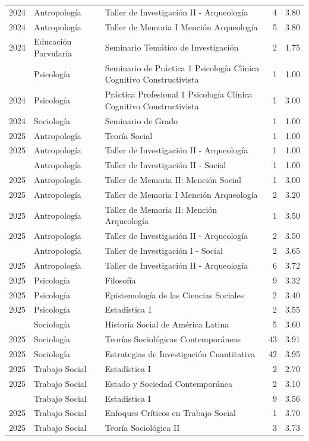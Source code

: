 \documentclass[
  spanish,
  a4paper,
  oneside]{scrbook}
\begin{document}
\begin{longtable}[t]{lllrr}
2024 & Antropología & Taller de Investigación II - Arqueología & 4 & 3.80\\
2024 & Antropología & Taller de Memoria I Mención Arqueología & 5 & 3.80\\
2024 & Educación Parvularia & Seminario Temático de Investigación & 2 & 1.75\\
\addlinespace
2024 & Psicología & Seminario de Práctica 1 Psicología Clínica Cognitivo Constructivista & 1 & 1.00\\
2024 & Psicología & Práctica Profesional 1 Psicología Clínica Cognitivo Constructivista & 1 & 3.00\\
2024 & Sociología & Seminario de Grado & 1 & 1.00\\
2025 & Antropología & Teoría Social & 1 & 1.00\\
2025 & Antropología & Taller de Investigación II - Arqueología & 1 & 1.00\\
\addlinespace
2025 & Antropología & Taller de Investigación II - Social & 1 & 1.00\\
2025 & Antropología & Taller de Memoria II: Mención Social & 1 & 3.00\\
2025 & Antropología & Taller de Memoria I Mención Arqueología & 2 & 3.20\\
2025 & Antropología & Taller de Memoria II: Mención Arqueología & 1 & 3.50\\
2025 & Antropología & Taller de Investigación II - Arqueología & 2 & 3.50\\
\addlinespace
2025 & Antropología & Taller de Investigación I - Social & 2 & 3.65\\
2025 & Antropología & Taller de Investigación II - Arqueología & 6 & 3.72\\
2025 & Psicología & Filosofía & 9 & 3.32\\
2025 & Psicología & Epistemología de las Ciencias Sociales & 2 & 3.40\\
2025 & Psicología & Estadística 1 & 2 & 3.55\\
\addlinespace
2025 & Sociología & Historia Social de América Latina & 5 & 3.60\\
2025 & Sociología & Teorías Sociológicas Contemporáneas & 43 & 3.91\\
2025 & Sociología & Estrategias de Investigación Cuantitativa & 42 & 3.95\\
2025 & Trabajo Social & Estadística I & 2 & 2.70\\
2025 & Trabajo Social & Estado y Sociedad Contemporánea & 2 & 3.10\\
\addlinespace
2025 & Trabajo Social & Estadística I & 9 & 3.56\\
2025 & Trabajo Social & Enfoques Críticos en Trabajo Social & 1 & 3.70\\
2025 & Trabajo Social & Teoría Sociológica II & 3 & 3.73\\
\bottomrule

\end{longtable}
\end{document}
